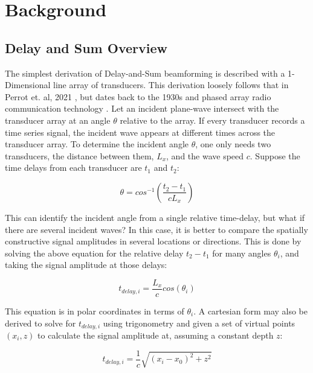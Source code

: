 \chapter{Background}
\label{chapter2:background}
\graphicspath{{Chapter-2/graphics/}}

\section{Delay and Sum Overview}
\label{chapter2:das_Overview}

    The simplest derivation of Delay-and-Sum beamforming is described with a 1-Dimensional line array of transducers. This derivation loosely follows that in Perrot et. al, 2021 \cite{perrotYouThinkYou2021a}, but dates back to the 1930s and phased array radio communication technology \cite{1686435}. Let an incident plane-wave intersect with the transducer array at an angle $\theta$ relative to the array. If every transducer records a time series signal, the incident wave appears at different times across the transducer array. To determine the incident angle $\theta$, one only needs two transducers, the distance between them, $L_x$, and the wave speed $c$. Suppose the time delays from each transducer are $t_1$ and $t_2$:

    \begin{equation} 
        \theta = cos^{-1}(\frac{t_2 - t_1}{c L_x})
    \end{equation}

    This can identify the incident angle from a single relative time-delay, but what if there are several incident waves? In this case, it is better to compare the spatially constructive signal amplitudes in several locations or directions. This is done by solving the above equation for the relative delay $t_2 - t_1$ for many angles $\theta_i$, and taking the signal amplitude at those delays:

    \begin{equation}
        t_{delay,i} = \frac{L_x}{c} cos(\theta_i)
    \end{equation}

    This equation is in polar coordinates in terms of $\theta_i$. A cartesian form may also be derived to solve for $t_{delay,i}$ using trigonometry and given a set of virtual points $(x_i,z)$ to calculate the signal amplitude at, assuming a constant depth $z$:

    \begin{equation} \label{eq:timedelay}
        t_{delay,i} = \frac{1}{c} \sqrt{(x_i - x_0)^2 + z^2}
    \end{equation}

